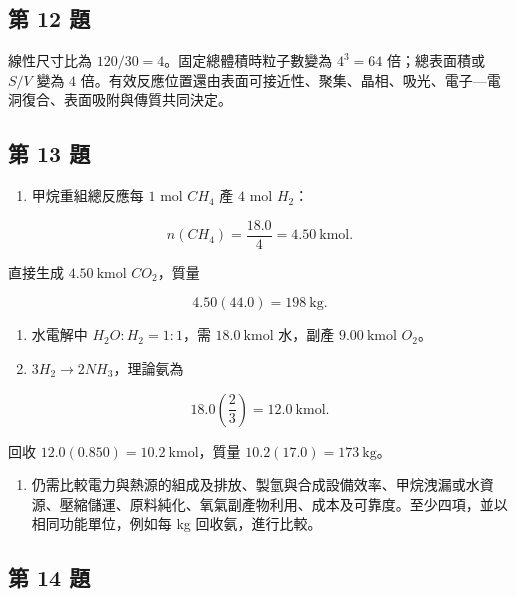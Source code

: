 \documentclass[11pt,a4paper]{article}
\providecommand{\tightlist}{%
  \setlength{\itemsep}{0pt}\setlength{\parskip}{0pt}}
\begin{document}
\subsection{第 12 題}\label{ux7b2c-12-ux984c}

線性尺寸比為 \(120/30=4\)。固定總體積時粒子數變為 \(4^3=64\) 倍；總表面積或 \(S/V\) 變為 \(4\) 倍。有效反應位置還由表面可接近性、聚集、晶相、吸光、電子---電洞復合、表面吸附與傳質共同決定。

\subsection{第 13 題}\label{ux7b2c-13-ux984c}

\begin{enumerate}
\def\labelenumi{(\alph{enumi})}
\tightlist
\item
  甲烷重組總反應每 \(1\) mol \(CH_4\) 產 \(4\) mol \(H_2\)：
\end{enumerate}

\[
n(CH_4)=\frac{18.0}{4}=4.50\ \mathrm{kmol}.
\]

直接生成 \(4.50\ \mathrm{kmol}\) \(CO_2\)，質量

\[
4.50(44.0)=198\ \mathrm{kg}.
\]

\begin{enumerate}
\def\labelenumi{(\alph{enumi})}
\setcounter{enumi}{1}
\item
  水電解中 \(H_2O:H_2=1:1\)，需 \(18.0\ \mathrm{kmol}\) 水，副產 \(9.00\ \mathrm{kmol}\) \(O_2\)。
\item
  \(3H_2\rightarrow2NH_3\)，理論氨為
\end{enumerate}

\[
18.0\left(\frac23\right)=12.0\ \mathrm{kmol}.
\]

回收 \(12.0(0.850)=10.2\ \mathrm{kmol}\)，質量 \(10.2(17.0)=173\ \mathrm{kg}\)。

\begin{enumerate}
\def\labelenumi{(\alph{enumi})}
\setcounter{enumi}{3}
\tightlist
\item
  仍需比較電力與熱源的組成及排放、製氫與合成設備效率、甲烷洩漏或水資源、壓縮儲運、原料純化、氧氣副產物利用、成本及可靠度。至少四項，並以相同功能單位，例如每 kg 回收氨，進行比較。
\end{enumerate}

\subsection{第 14 題}\label{ux7b2c-14-ux984c}
\end{document}
